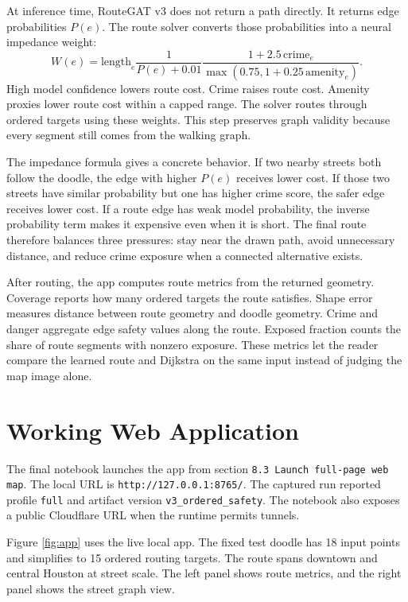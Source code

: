 \documentclass{article}
\begin{document}
At inference time, RouteGAT v3 does not return a path directly. It returns edge probabilities \(P(e)\). The route solver converts those probabilities into a neural impedance weight:
\begin{equation}
  W(e)=
  \mathrm{length}_e
  \frac{1}{P(e)+0.01}
  \frac{1 + 2.5\,\mathrm{crime}_e}{\max(0.75, 1 + 0.25\,\mathrm{amenity}_e)}.
\end{equation}
High model confidence lowers route cost. Crime raises route cost. Amenity proxies lower route cost within a capped range. The solver routes through ordered targets using these weights. This step preserves graph validity because every segment still comes from the walking graph.

The impedance formula gives a concrete behavior. If two nearby streets both follow the doodle, the edge with higher \(P(e)\) receives lower cost. If those two streets have similar probability but one has higher crime score, the safer edge receives lower cost. If a route edge has weak model probability, the inverse probability term makes it expensive even when it is short. The final route therefore balances three pressures: stay near the drawn path, avoid unnecessary distance, and reduce crime exposure when a connected alternative exists.

After routing, the app computes route metrics from the returned geometry. Coverage reports how many ordered targets the route satisfies. Shape error measures distance between route geometry and doodle geometry. Crime and danger aggregate edge safety values along the route. Exposed fraction counts the share of route segments with nonzero exposure. These metrics let the reader compare the learned route and Dijkstra on the same input instead of judging the map image alone.

\section{Working Web Application}

The final notebook launches the app from section \texttt{8.3 Launch full-page web map}. The local URL is \texttt{http://127.0.0.1:8765/}. The captured run reported profile \texttt{full} and artifact version \texttt{v3\_ordered\_safety}. The notebook also exposes a public Cloudflare URL when the runtime permits tunnels.

Figure \ref{fig:app} uses the live local app. The fixed test doodle has 18 input points and simplifies to 15 ordered routing targets. The route spans downtown and central Houston at street scale. The left panel shows route metrics, and the right panel shows the street graph view.
\end{document}
